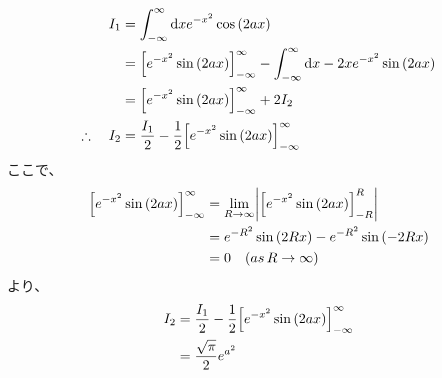 \documentclass[dvipdfmx,a4paper]{jsarticle}
\begin{document}
\begin{align*}
I_1 &= \int_{-\infty}^{\infty}\mathrm{d}x e^{-x^2}\cos{(2ax)}\\
&= \Bigl[e^{-x^2}\sin{(2ax)}\Bigr]_{-\infty}^{\infty} - \int_{-\infty}^{\infty}\mathrm{d}x -2x e^{-x^2}\sin{(2ax)}\\
&=\Bigl[e^{-x^2}\sin{(2ax)}\Bigr]_{-\infty}^{\infty} +2 I_2\\
\therefore \quad I_2 &= \frac{I_1}{2} - \frac{1}{2}\Bigl[e^{-x^2}\sin{(2ax)}\Bigr]_{-\infty}^{\infty}
\end{align*}
ここで、
\begin{align*}
\Bigl[e^{-x^2}\sin{(2ax)}\Bigr]_{-\infty}^{\infty}&=\lim_{R\to \infty}\biggl|\Bigl[e^{-x^2}\sin{(2ax)}\Bigr]_{-R}^{R}\biggr| \\
&= e^{-R^2}\sin{(2Rx)} - e^{-R^2}\sin{(-2Rx)}\\
&= 0 \quad(as \, R \to \infty)
\end{align*}
より、
\begin{align*}
I_2 &= \frac{I_1}{2} - \frac{1}{2}\Bigl[e^{-x^2}\sin{(2ax)}\Bigr]_{-\infty}^{\infty}\\
&= \frac{\sqrt{\pi}}{2}e^{a^2}
\end{align*}
\end{document}
